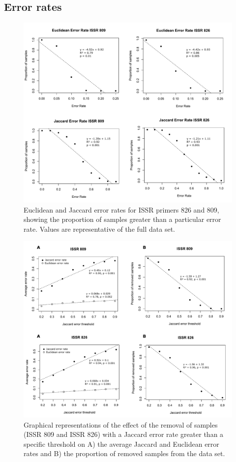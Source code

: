 \subsection{Error rates}
\begin{figure}[H]
	\centering
	\includegraphics[scale =0.6]{Images/error_rates_graphs.pdf}
	\caption{Euclidean and Jaccard error rates for ISSR primers 826 and 809, showing the proportion of samples greater than a particular error rate. Values are representative of the full data set.}
	\label{fig:error_graphs}
\end{figure}

\begin{figure}[H]
	\centering
	\includegraphics[scale =0.6]{Images/error_stats_graphs.pdf}
	\caption{Graphical representations of the effect of the removal of samples (ISSR 809 and ISSR 826) with a Jaccard error rate greater than a specific threshold on A) the average Jaccard and Euclidean error rates and B) the proportion of removed samples from the data set.}
	\label{fig:error_graphs2}
\end{figure}




